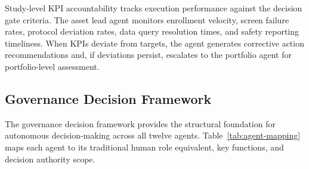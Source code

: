 Study-level KPI accountability tracks execution performance against the decision gate
criteria. The asset lead agent monitors enrollment velocity, screen failure rates, protocol
deviation rates, data query resolution times, and safety reporting timeliness. When KPIs
deviate from targets, the agent generates corrective action recommendations and, if
deviations persist, escalates to the portfolio agent for portfolio-level assessment.

\subsection{Governance Decision Framework}

The governance decision framework provides the structural foundation for autonomous
decision-making across all twelve agents. Table~\ref{tab:agent-mapping} maps each agent to
its traditional human role equivalent, key functions, and decision authority scope.

